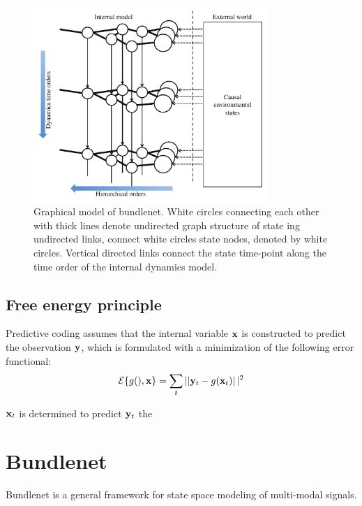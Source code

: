 \documentclass{article}
\begin{document}
\begin{figure}[htbp]
  \includegraphics[width=0.8\textwidth]{../figures/gmodel_BN.pdf}
  \caption{Graphical model of bundlenet. 
  White circles connecting each other with thick lines denote
  undirected graph structure of state ing undirected links, connect white circles state nodes, denoted by white circles.
  Vertical directed links connect the state time-point along
   the time order of the internal dynamics model. }
   \label{g_BN}
\end{figure}



\subsection{Free energy principle}
Predictive coding assumes that the internal variable ${\bf x}$ is constructed to predict the observation ${\bf y}$,
which is formulated with a minimization of the following error functional:
\begin{align}
 {\cal E}\{ g(), {\bf x} \} = \sum_t \left|| {\bf y}_{t} - g({\bf x}_t) \right||^2
\end{align}

${\bf x}_t$ is determined to predict ${\bf y}_t$ the






\section{Bundlenet}
Bundlenet is a general framework for state space modeling of multi-modal signals.
\end{document}
